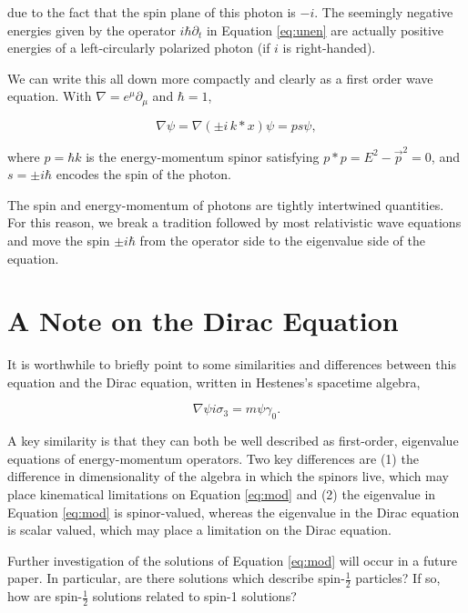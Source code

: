 \documentclass{birkjour}
\begin{document}
due to the fact that the spin plane of this photon is $-i$. The seemingly negative energies given by the operator $i \hbar \partial_t$ in Equation \ref{eq:unen} are actually positive energies of a left-circularly polarized photon (if $i$ is right-handed). 

We can write this all down more compactly and clearly as a first order wave equation. With $\nabla = e^\mu \partial_\mu$ and $\hbar = 1$,

\begin{equation}
  \nabla \psi = \nabla (\pm i \, k * x) \psi = p s \psi,\label{eq:mod}
\end{equation}

where $p = \hbar k$ is the energy-momentum spinor satisfying $p * p = E^2 - \vec p^2 = 0$, and $s = \pm i \hbar$ encodes the spin of the photon.

The spin and energy-momentum of photons are tightly intertwined quantities. For this reason, we break a tradition followed by most relativistic wave equations and move the spin $\pm i \hbar$ from the operator side to the eigenvalue side of the equation.

\section{A Note on the Dirac Equation}

It is worthwhile to briefly point to some similarities and differences between this equation and the Dirac equation, written in Hestenes's spacetime algebra,\cite{hestenes}

\begin{equation}
  \nabla \psi i \sigma_3 = m \psi \gamma_0.
\end{equation}

A key similarity is that they can both be well described as first-order, eigenvalue equations of energy-momentum operators. Two key differences are (1) the difference in dimensionality of the algebra in which the spinors live, which may place kinematical limitations on Equation \ref{eq:mod} and (2) the eigenvalue in Equation \ref{eq:mod} is spinor-valued, whereas the eigenvalue in the Dirac equation is scalar valued, which may place a limitation on the Dirac equation.

Further investigation of the solutions of Equation \ref{eq:mod} will occur in a future paper. In particular, are there solutions which describe spin-$\frac{1}{2}$ particles? If so, how are spin-$\frac{1}{2}$ solutions related to spin-1 solutions?
\end{document}
